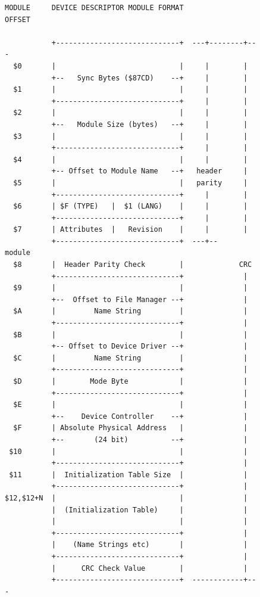 \documentclass[
]{article}
\begin{document}
\begin{figure}
\centering
\begin{verbatim}
MODULE     DEVICE DESCRIPTOR MODULE FORMAT
OFFSET

           +-----------------------------+  ---+--------+---
  $0       |                             |     |        |
           +--   Sync Bytes ($87CD)    --+     |        |
  $1       |                             |     |        |
           +-----------------------------+     |        |
  $2       |                             |     |        |
           +--   Module Size (bytes)   --+     |        |
  $3       |                             |     |        |
           +-----------------------------+     |        |
  $4       |                             |     |        |
           +-- Offset to Module Name   --+   header     |
  $5       |                             |   parity     |
           +-----------------------------+     |        |
  $6       | $F (TYPE)   |  $1 (LANG)    |     |        |
           +-----------------------------+     |        |
  $7       | Attributes  |   Revision    |     |        |
           +-----------------------------+  ---+--    module
  $8       |  Header Parity Check        |             CRC
           +-----------------------------+              |
  $9       |                             |              |
           +--  Offset to File Manager --+              |
  $A       |         Name String         |              |
           +-----------------------------+              |
  $B       |                             |              |
           +-- Offset to Device Driver --+              |
  $C       |         Name String         |              |
           +-----------------------------+              |
  $D       |        Mode Byte            |              |
           +-----------------------------+              |
  $E       |                             |              |
           +--    Device Controller    --+              |
  $F       | Absolute Physical Address   |              |
           +--       (24 bit)          --+              |
 $10       |                             |              |
           +-----------------------------+              |
 $11       |  Initialization Table Size  |              |
           +-----------------------------+              |
$12,$12+N  |                             |              |
           |  (Initialization Table)     |              |
           |                             |              |
           +-----------------------------+              |
           |    (Name Strings etc)       |              |
           +-----------------------------+              |
           |      CRC Check Value        |              |
           +-----------------------------+  ------------+---
\end{verbatim}
\caption{}
\end{figure}
\end{document}
